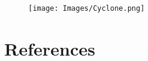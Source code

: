 \documentclass[final,12pt]{elsarticle}
\begin{document}
\begin{figure}[h]
\centering\texttt{[image: Images/Cyclone.png]}
\end{figure}


%
\newpage
%
%
%
%
%


%
%



%

%

\clearpage
\section{References}




\end{document}
